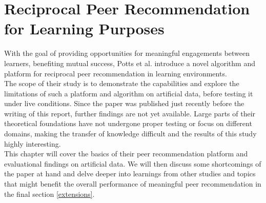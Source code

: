 \documentclass[conference]{IEEEtran}
\begin{document}
\section{Reciprocal Peer Recommendation for Learning Purposes} \label{paper}
With the goal of providing opportunities for meaningful engagements between learners, benefiting mutual success, Potts et al. introduce a novel algorithm and platform for reciprocal peer recommendation in learning environments. \cite{potts2018reciprocal}\\
The scope of their study is to demonstrate the capabilities and explore the limitations of such a platform and algorithm on artificial data, before testing it under live conditions. Since the paper was published just recently before the writing of this report, further findings are not yet available. Large parts of their theoretical foundations have not undergone proper testing or focus on different domains, making the transfer of knowledge difficult and the results of this study highly interesting.\\
This chapter will cover the basics of their peer recommendation platform and evaluational findings on artificial data. We will then discuss some shortcomings of the paper at hand and delve deeper into learnings from other studies and topics that might benefit the overall performance of meaningful peer recommendation in the final section \ref{extensions}.\\
\end{document}
